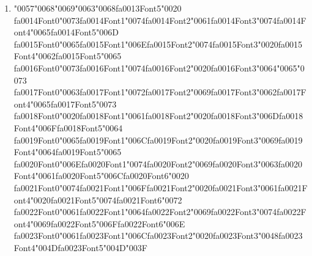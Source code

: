 \documentclass[11pt]{article}
\begin{document}
\begin{enumerate}[label=Q\arabic*., leftmargin=*]
\textbf{A.} Beginning of an entity

\textbf{B.} Inside an entity

\textbf{C.} Outside any entity

\textbf{D.} Between two tokens

\item {\char"0057}{\char"0068}{\char"0069}{\char"0063}{\char"0068}{\csname fa0013Font5\endcsname\char"0020} {\csname fa0014Font0\endcsname\char"0073}{\csname fa0014Font1\endcsname\char"0074}{\csname fa0014Font2\endcsname\char"0061}{\csname fa0014Font3\endcsname\char"0074}{\csname fa0014Font4\endcsname\char"0065}{\csname fa0014Font5\endcsname\char"006D} {\csname fa0015Font0\endcsname\char"0065}{\csname fa0015Font1\endcsname\char"006E}{\csname fa0015Font2\endcsname\char"0074}{\csname fa0015Font3\endcsname\char"0020}{\csname fa0015Font4\endcsname\char"0062}{\csname fa0015Font5\endcsname\char"0065} {\csname fa0016Font0\endcsname\char"0073}{\csname fa0016Font1\endcsname\char"0074}{\csname fa0016Font2\endcsname\char"0020}{\csname fa0016Font3\endcsname\char"0064}{\char"0065}{\char"0073} {\csname fa0017Font0\endcsname\char"0063}{\csname fa0017Font1\endcsname\char"0072}{\csname fa0017Font2\endcsname\char"0069}{\csname fa0017Font3\endcsname\char"0062}{\csname fa0017Font4\endcsname\char"0065}{\csname fa0017Font5\endcsname\char"0073} {\csname fa0018Font0\endcsname\char"0020}{\csname fa0018Font1\endcsname\char"0061}{\csname fa0018Font2\endcsname\char"0020}{\csname fa0018Font3\endcsname\char"006D}{\csname fa0018Font4\endcsname\char"006F}{\csname fa0018Font5\endcsname\char"0064} {\csname fa0019Font0\endcsname\char"0065}{\csname fa0019Font1\endcsname\char"006C}{\csname fa0019Font2\endcsname\char"0020}{\csname fa0019Font3\endcsname\char"0069}{\csname fa0019Font4\endcsname\char"0064}{\csname fa0019Font5\endcsname\char"0065} {\csname fa0020Font0\endcsname\char"006E}{\csname fa0020Font1\endcsname\char"0074}{\csname fa0020Font2\endcsname\char"0069}{\csname fa0020Font3\endcsname\char"0063}{\csname fa0020Font4\endcsname\char"0061}{\csname fa0020Font5\endcsname\char"006C}{\csname fa0020Font6\endcsname\char"0020} {\csname fa0021Font0\endcsname\char"0074}{\csname fa0021Font1\endcsname\char"006F}{\csname fa0021Font2\endcsname\char"0020}{\csname fa0021Font3\endcsname\char"0061}{\csname fa0021Font4\endcsname\char"0020}{\csname fa0021Font5\endcsname\char"0074}{\csname fa0021Font6\endcsname\char"0072} {\csname fa0022Font0\endcsname\char"0061}{\csname fa0022Font1\endcsname\char"0064}{\csname fa0022Font2\endcsname\char"0069}{\csname fa0022Font3\endcsname\char"0074}{\csname fa0022Font4\endcsname\char"0069}{\csname fa0022Font5\endcsname\char"006F}{\csname fa0022Font6\endcsname\char"006E} {\csname fa0023Font0\endcsname\char"0061}{\csname fa0023Font1\endcsname\char"006C}{\csname fa0023Font2\endcsname\char"0020}{\csname fa0023Font3\endcsname\char"0048}{\csname fa0023Font4\endcsname\char"004D}{\csname fa0023Font5\endcsname\char"004D}{\char"003F}


\end{enumerate}
\end{document}

